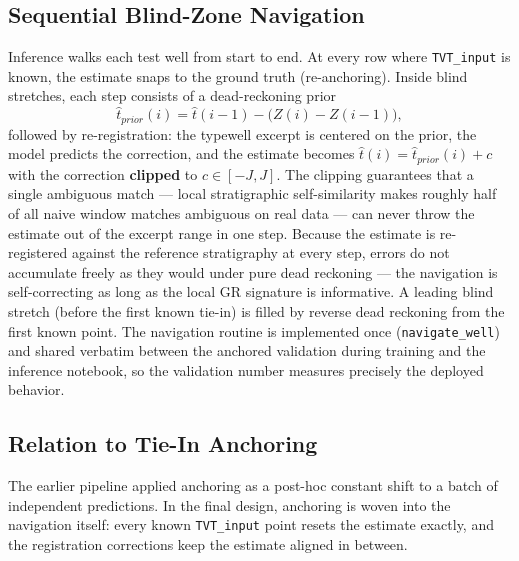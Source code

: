 \documentclass[12pt, a4paper]{article}
\begin{document}
    \subsection{Sequential Blind-Zone Navigation}
    Inference walks each test well from start to end. At every row where \texttt{TVT\_input} is known, the estimate snaps to the ground truth (re-anchoring). Inside blind stretches, each step consists of a dead-reckoning prior
    \begin{equation}
        \hat{t}_{prior}(i) = \hat{t}(i-1) - \big(Z(i) - Z(i-1)\big),
    \end{equation}
    followed by re-registration: the typewell excerpt is centered on the prior, the model predicts the correction, and the estimate becomes $\hat{t}(i) = \hat{t}_{prior}(i) + c$ with the correction \textbf{clipped} to $c \in [-J, J]$. The clipping guarantees that a single ambiguous match --- local stratigraphic self-similarity makes roughly half of all naive window matches ambiguous on real data --- can never throw the estimate out of the excerpt range in one step. Because the estimate is re-registered against the reference stratigraphy at every step, errors do not accumulate freely as they would under pure dead reckoning --- the navigation is self-correcting as long as the local GR signature is informative. A leading blind stretch (before the first known tie-in) is filled by reverse dead reckoning from the first known point. The navigation routine is implemented once (\texttt{navigate\_well}) and shared verbatim between the anchored validation during training and the inference notebook, so the validation number measures precisely the deployed behavior.

    \subsection{Relation to Tie-In Anchoring}
    The earlier pipeline applied anchoring as a post-hoc constant shift to a batch of independent predictions. In the final design, anchoring is woven into the navigation itself: every known \texttt{TVT\_input} point resets the estimate exactly, and the registration corrections keep the estimate aligned in between.
\end{document}
